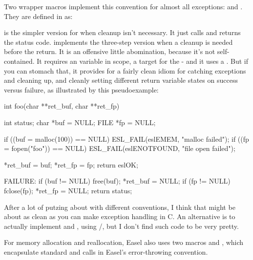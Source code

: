 Two wrapper macros implement this convention for almost all
exceptions:  and . They are
defined in  as:



 is the simpler version for when cleanup isn't
necessary. It just calls  and returns the status
code.  implements the three-step version when a
cleanup is needed before the return. It is an offensive little
abomination, because it's not self-contained. It requires an
 variable in scope, a  target for
the  - and it uses a . But if you can stomach
that, it provides for a fairly clean idiom for catching exceptions and
cleaning up, and cleanly setting different return variable states on
success versus failure, as illustrated by this pseudoexample:

\begin{cchunk}
int 
foo(char **ret_buf, char **ret_fp)
{
    int status;
    char *buf = NULL;
    FILE *fp  = NULL;

    if ((buf = malloc(100))  == NULL) ESL_FAIL(eslEMEM,      "malloc failed");
    if ((fp  = fopen("foo")) == NULL) ESL_FAIL(eslENOTFOUND, "file open failed");

    *ret_buf = buf;
    *ret_fp  = fp;
    return eslOK;

  FAILURE:
    if (buf != NULL) free(buf);  *ret_buf = NULL;
    if (fp  != NULL) fclose(fp); *ret_fp  = NULL;
    return status;
}
\end{cchunk}

After a lot of putzing about with different conventions, I think that
might be about as clean as you can make exception handling in C. An
alternative is to actually implement  and ,
using /, but I don't find such code
to be very pretty.

For memory allocation and reallocation, Easel also uses two macros
 and , which encapsulate
standard  and  calls in Easel's
error-throwing convention.


